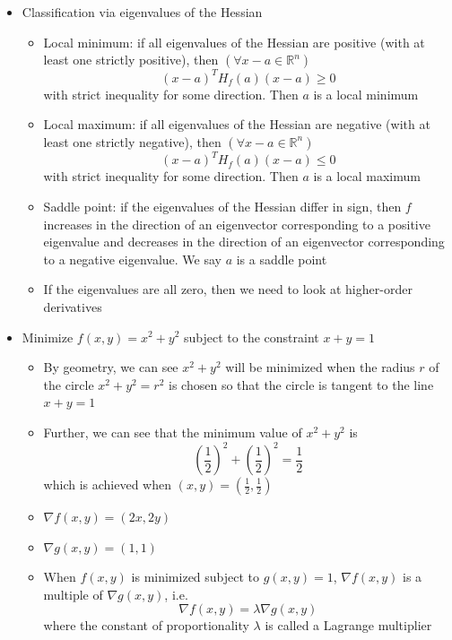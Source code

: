 \documentclass{article}
\begin{document}
\begin{itemize}
\begin{itemize}
\[        \]
        and for at least one choice $> 0$. Therefore, $a$ is a local minimum of $f$
    \end{itemize}
    \item Classification via eigenvalues of the Hessian
    \begin{itemize}
        \item Local minimum: if all eigenvalues of the Hessian are positive (with at least one strictly positive), then $(\forall x - a \in \mathbb{R}^n)$
        \[
        (x-a)^T H_f(a) (x-a) \ge 0
        \]
        with strict inequality for some direction. Then $a$ is a local minimum
        \item Local maximum: if all eigenvalues of the Hessian are negative (with at least one strictly negative), then $(\forall x - a \in \mathbb{R}^n)$
        \[
        (x-a)^T H_f(a) (x-a) \le 0
        \]
        with strict inequality for some direction. Then $a$ is a local maximum
        \item Saddle point: if the eigenvalues of the Hessian differ in sign, then $f$ increases in the direction of an eigenvector corresponding to a positive eigenvalue and decreases in the direction of an eigenvector corresponding to a negative eigenvalue. We say $a$ is a saddle point
        \item If the eigenvalues are all zero, then we need to look at higher-order derivatives
    \end{itemize}
    \item Minimize $f(x,y) = x^2 + y^2$ subject to the constraint $x+y=1$
    \begin{itemize}
        \item By geometry, we can see $x^2+y^2$ will be minimized when the radius $r$ of the circle $x^2+y^2 = r^2$ is chosen so that the circle is tangent to the line $x+y=1$
        \item Further, we can see that the minimum value of $x^2+y^2$ is
        \[
        \left(\frac{1}{2}\right)^2 + \left( \frac{1}{2} \right)^2 =\frac{1}{2}
        \]
        which is achieved when $(x,y) = (\frac{1}{2},\frac{1}{2})$
        \item $\nabla f(x,y) = (2x,2y)$
        \item $\nabla g(x,y) = (1,1)$
        \item When $f(x,y)$ is minimized subject to $g(x,y) = 1$, $\nabla f(x,y)$ is a multiple of $\nabla g(x,y)$, i.e.
        \[
        \nabla f(x,y) = \lambda \nabla g(x,y)
        \]
        where the constant of proportionality $\lambda$ is called a Lagrange multiplier

\end{itemize}
\end{itemize}
\end{document}
